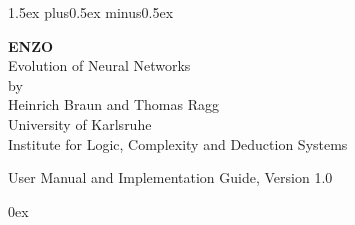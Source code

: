 




\sloppy
\frenchspacing

\parindent0pt
\parskip1.5ex plus0.5ex minus0.5ex


\pagestyle{headings}

\makeindex





%
\renewcommand{\textfraction}{0.0}
\renewcommand{\topfraction}{1.0}
\renewcommand{\floatpagefraction}{1.0}
\renewcommand{\bottomfraction}{1.0}





\thispagestyle{empty}

\centerline{}

\vspace{1cm}

\begin{center}
{ {\Huge  \bf ENZO \\}
\vspace*{0.5cm}
 {\large      Evolution of Neural Networks\\
\vspace*{0.2cm}
by\\
\vspace*{0.2cm}
 Heinrich Braun and Thomas Ragg
}\\
\vspace*{0.2cm}
{\Large \sc University of Karlsruhe\\}
\vspace*{0.2cm}
	{\large \sc Institute for Logic, Complexity and Deduction Systems\\}

\vspace*{1cm}


       {\LARGE  User Manual and Implementation Guide, Version 1.0}}
\end{center}

\clearpage
{\parskip0ex \tableofcontents}
\vfill
\pagebreak
{}








\begin{appendix}
  




\end{appendix}






